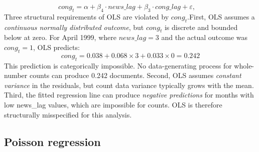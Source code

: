 \documentclass[11pt]{article}
\begin{document}
\begin{equation}
  \mathit{cong}_t = \alpha + \beta_4 \cdot \mathit{news\_lag}
                           + \beta_3 \cdot \mathit{cong\_lag}
                           + \varepsilon, \quad
  \label{eq:ols}
\end{equation} 
Three structural requirements of OLS are violated by $\mathit{cong}_t$.First, OLS assumes a \textit{continuous normally distributed outcome}, but $\mathit{cong}_t$ is discrete and bounded below at zero. For April
1999, where $\mathit{news\_lag} = 3$ and the actual outcome was
$\mathit{cong}_t = 1$, OLS predicts:
\begin{equation*}
  \mathit{cong}_t
    = 0.038 + 0.068 \times 3 + 0.033 \times 0 = 0.242
\end{equation*}
This prediction is categorically impossible. No data-generating process for whole-number counts can produce 0.242 documents. Second, OLS assumes \textit{constant variance} in the residuals, but
count data variance typically grows with the mean. Third, the fitted regression line can produce
\textit{negative predictions} for months with low news\_lag values, which are impossible for counts. OLS is therefore structurally misspecified for this analysis.

\subsection{Poisson regression}
\end{document}
